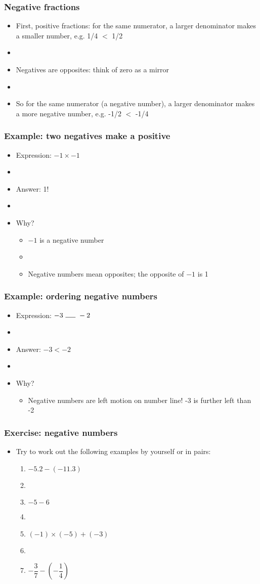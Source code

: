 \documentclass[12pt]{beamer}
\newcommand{\myframe}[1]{\begin{frame} \frametitle{#1}}
\begin{document}
\myframe{Negative fractions}
\begin{itemize}
\item First, positive fractions: for the same numerator, a larger denominator makes a smaller number, e.g. 1/4 $<$ 1/2
\item[]
\item Negatives are opposites: think of zero as a mirror
\item[]
\item So for the same numerator (a negative number), a larger denominator makes a more negative number, e.g. -1/2 $<$ -1/4
\end{itemize}
\end{frame}

\myframe{Example: two negatives make a positive}
\begin{itemize}
\item Expression: $-1 \times -1$
\item[]
\item Answer: 1!
\item[]
\item Why?
\begin{itemize}
\item $-1$ is a negative number
\item[]
\item Negative numbers mean opposites; the opposite of $-1$ is 1
\end{itemize}
\end{itemize}
\end{frame}

\myframe{Example: ordering negative numbers}
\begin{itemize}
\item Expression: $-3 \ \rule{.5cm}{0.15mm} \ -2$
\item[]
\item Answer: $-3 < -2$
\item[]
\item Why?
\begin{itemize}
\item Negative numbers are left motion on number line! -3 is further left than -2
\end{itemize}
\end{itemize}
\end{frame}

\myframe{Exercise: negative numbers}
\begin{itemize}
\item Try to work out the following examples by yourself or in pairs:
\begin{enumerate}
\item $-5.2 - (-11.3)$
\item[]
\item $-5 - 6$
\item[]
\item $(-1)\times(-5) + (-3)$
\item[]
\item $-\dfrac{3}{7} - \left(-\dfrac{1}{4}\right)$
\end{enumerate}
\end{itemize}
\end{frame}
\end{document}
